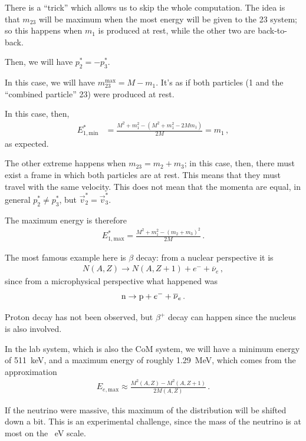 \documentclass[main.tex]{subfiles}
\begin{document}
There is a ``trick'' which allows us to skip the whole computation. 
The idea is that \(m_{23} \) will be maximum when the most energy will be given to the 23 system; so this happens when \(m_1 \) is produced at rest, while the other two are back-to-back. 

Then, we will have \(p^{*}_2 = -p^{*}_3\). 

In this case, we will have \(m_{23}^{\text{max}} = M - m_1 \). It's as if both particles (1 and the ``combined particle'' 23) were produced at rest. 

In this case, then, 
%
\begin{align}
E^{*}_{1, \text{min}} &= \frac{M^2 + m_1^2 - (M^2 + m_1^2 - 2 M m_1 )}{2M} = m_1
\,,
\end{align}
%
as expected. 

The other extreme happens when \(m_{23} = m_2 + m_3 \); in this case, then, there must exist a frame in which both particles are at rest. 
This means that they must travel with the same velocity. 
This does not mean that the momenta are equal, in general \(p^{*}_2 \neq p^{*}_3\), but \(\vec{v}^{*}_2 = \vec{v}^{*}_3\).

The maximum energy is therefore 
%
\begin{align}
E^{*}_{1, \text{max}} = \frac{M^2 + m_1^2 - (m_2 + m_3 )^2}{2 M }
\,.
\end{align}

The most famous example here is \(\beta \) decay: from a nuclear perspective it is 
%
\begin{align}
N(A, Z) \to N(A, Z+1) + e^{-} + \overline{\nu}_e
\,,
\end{align}
%
since from a microphysical perspective what happened was
%
\begin{align}
\ce{n} \to \ce{p} + e^{-} + \overline{\nu}_{e}
\,.
\end{align}

Proton decay has not been observed, but \(\beta^{+}\) decay can happen since the nucleus is also involved. 

In the lab system, which is also the CoM system, we will have a minimum energy of \SI{511}{keV}, and a maximum energy of roughly \SI{1.29}{MeV}, which comes from the approximation 
%
\begin{align}
E _{e, \text{max}} \approx \frac{M^2(A, Z) - M^2 (A, Z+1)}{2 M(A, Z)}
\,.
\end{align}

If the neutrino were massive, this maximum of the distribution will be shifted down a bit.
This is an experimental challenge, since the mass of the neutrino is at most on the \SI{}{eV} scale. 
\end{document}
